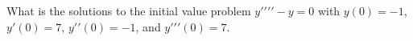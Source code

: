 What is the solutions to the initial value problem $y\prime\prime\prime\prime-y=0$ with $y(0)=-1$, $y\prime(0)=7$, $y\prime\prime(0)=-1$, and $y\prime\prime\prime(0)=7$.